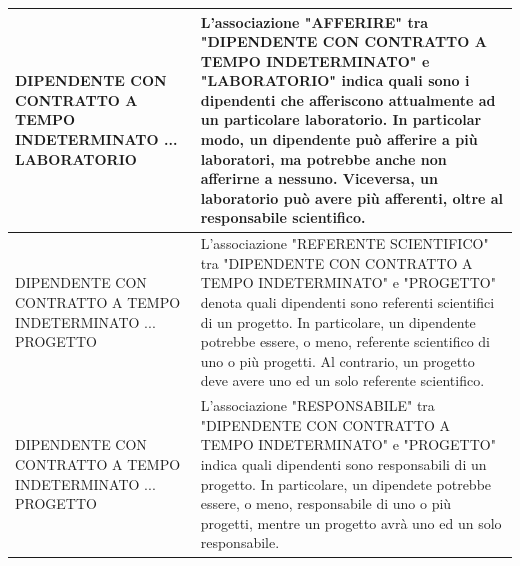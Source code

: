 \begin{tabular}{|C{3.5cm}|L{11.2cm}|}
            \hline
                DIPENDENTE CON CONTRATTO A TEMPO INDETERMINATO ... LABORATORIO &
                L'associazione "AFFERIRE" tra "DIPENDENTE CON CONTRATTO A TEMPO INDETERMINATO" e "LABORATORIO" indica quali sono i dipendenti che afferiscono attualmente ad un particolare laboratorio. In particolar modo, un dipendente può afferire a più laboratori, ma potrebbe anche non afferirne a nessuno. Viceversa, un laboratorio può avere più afferenti, oltre al responsabile scientifico.\\
            \hline
                DIPENDENTE CON CONTRATTO A TEMPO INDETERMINATO ... PROGETTO &
                L'associazione "REFERENTE SCIENTIFICO" tra "DIPENDENTE CON CONTRATTO A TEMPO INDETERMINATO" e "PROGETTO" denota quali dipendenti sono referenti scientifici di un progetto. In particolare, un dipendente potrebbe essere, o meno, referente scientifico di uno o più progetti. Al contrario, un progetto deve avere uno ed un solo referente scientifico.\\
            \hline
                DIPENDENTE CON CONTRATTO A TEMPO INDETERMINATO ... PROGETTO &
                L'associazione "RESPONSABILE" tra "DIPENDENTE CON CONTRATTO A TEMPO INDETERMINATO" e "PROGETTO" indica quali dipendenti sono responsabili di un progetto. In particolare, un dipendete potrebbe essere, o meno, responsabile di uno o più progetti, mentre un progetto avrà uno ed un solo responsabile.\\
            \hline
        \end{tabular}

